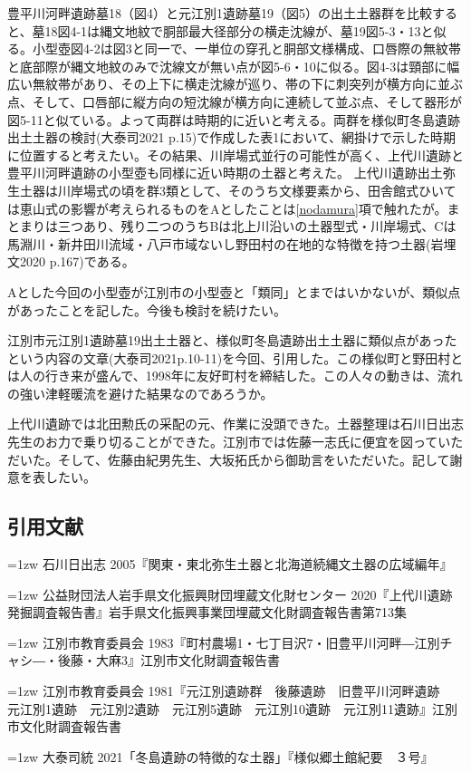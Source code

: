 \documentclass[a4j,11pt,twocolumn,openany]{jsbook}
\begin{document}
豊平川河畔遺跡墓18（図4）と元江別1遺跡墓19（図5）の出土土器群を比較すると、墓18図4-1は縄文地紋で胴部最大径部分の横走沈線が、墓19図5-3・13と似る。小型壺図4-2は図3と同一で、一単位の穿孔と胴部文様構成、口唇際の無紋帯と底部際が縄文地紋のみで沈線文が無い点が図5-6・10に似る。図4-3は頸部に幅広い無紋帯があり、その上下に横走沈線が巡り、帯の下に刺突列が横方向に並ぶ点、そして、口唇部に縦方向の短沈線が横方向に連続して並ぶ点、そして器形が図5-11と似ている。よって両群は時期的に近いと考える。両群を様似町冬島遺跡出土土器の検討(大泰司2021 p.15)で作成した表1において、網掛けで示した時期に位置すると考えたい。その結果、川岸場式並行の可能性が高く、上代川遺跡と豊平川河畔遺跡の小型壺も同様に近い時期の土器と考えた。
上代川遺跡出土弥生土器は川岸場式の頃を群3類として、そのうち文様要素から、田舎館式ひいては恵山式の影響が考えられるものをAとしたことは\ref{nodamura}項で触れたが。まとまりは三つあり、残り二つのうちBは北上川沿いの土器型式・川岸場式、Cは馬淵川・新井田川流域・八戸市域ないし野田村の在地的な特徴を持つ土器(岩埋文2020 p.167)である。

Aとした今回の小型壺が江別市の小型壺と「類同」とまではいかないが、類似点があったことを記した。今後も検討を続けたい。

江別市元江別1遺跡墓19出土土器と、様似町冬島遺跡出土土器に類似点があったという内容の文章(大泰司2021p.10-11)を今回、引用した。この様似町と野田村とは人の行き来が盛んで、1998年に友好町村を締結した。この人々の動きは、流れの強い津軽暖流を避けた結果なのであろうか。

上代川遺跡では北田勲氏の采配の元、作業に没頭できた。土器整理は石川日出志先生のお力で乗り切ることができた。江別市では佐藤一志氏に便宜を図っていただいた。そして、佐藤由紀男先生、大坂拓氏から御助言をいただいた。記して謝意を表したい。
\vspace{1\baselineskip}

\subsection*{引用文献}

{\small
	\hangindent=1zw
	\noindent
	石川日出志 2005『関東・東北弥生土器と北海道続縄文土器の広域編年』
	
	\hangindent=1zw
	\noindent
	公益財団法人岩手県文化振興財団埋蔵文化財センター 2020『上代川遺跡発掘調査報告書』岩手県文化振興事業団埋蔵文化財調査報告書第713集
	
	\hangindent=1zw
	\noindent
	江別市教育委員会 1983『町村農場1・七丁目沢7・旧豊平川河畔―江別チャシ―・後藤・大麻3』江別市文化財調査報告書
	
	\hangindent=1zw
	\noindent
	江別市教育委員会 1981『元江別遺跡群　後藤遺跡　旧豊平川河畔遺跡　元江別1遺跡　元江別2遺跡　元江別5遺跡　元江別10遺跡　元江別11遺跡』江別市文化財調査報告書
	
	\hangindent=1zw
	\noindent
	大泰司統 2021「冬島遺跡の特徴的な土器」『様似郷土館紀要　３号』
	
}
\end{document}
